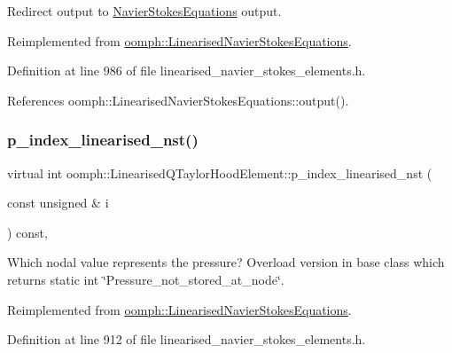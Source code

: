 Redirect output to \hyperlink{classoomph_1_1NavierStokesEquations}{Navier\+Stokes\+Equations} output. 



Reimplemented from \hyperlink{classoomph_1_1LinearisedNavierStokesEquations_a526bc349330e22ae332c75d0b9fd75df}{oomph\+::\+Linearised\+Navier\+Stokes\+Equations}.



Definition at line 986 of file linearised\+\_\+navier\+\_\+stokes\+\_\+elements.\+h.



References oomph\+::\+Linearised\+Navier\+Stokes\+Equations\+::output().

\mbox{\label{classoomph_1_1LinearisedQTaylorHoodElement_a9b411b9d761bbefa1ff7133fd053433f}} 
\subsubsection{\texorpdfstring{p\+\_\+index\+\_\+linearised\+\_\+nst()}{p\_index\_linearised\_nst()}}
{\footnotesize\ttfamily virtual int oomph\+::\+Linearised\+Q\+Taylor\+Hood\+Element\+::p\+\_\+index\+\_\+linearised\+\_\+nst (\begin{DoxyParamCaption}\item[{const unsigned \&}]{i }\end{DoxyParamCaption}) const\hspace{0.3cm}{\ttfamily [inline]}, {\ttfamily [virtual]}}



Which nodal value represents the pressure? Overload version in base class which returns static int \char`\"{}\+Pressure\+\_\+not\+\_\+stored\+\_\+at\+\_\+node\char`\"{}. 



Reimplemented from \hyperlink{classoomph_1_1LinearisedNavierStokesEquations_ae27e5313386ad80524a5aae41a1e23e1}{oomph\+::\+Linearised\+Navier\+Stokes\+Equations}.



Definition at line 912 of file linearised\+\_\+navier\+\_\+stokes\+\_\+elements.\+h.

